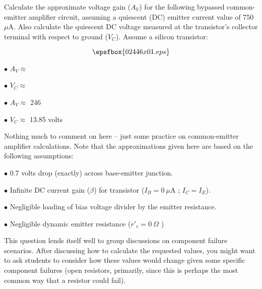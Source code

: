 

Calculate the approximate voltage gain ($A_V$) for the following bypassed common-emitter amplifier circuit, assuming a quiescent (DC) emitter current value of 750 $\mu$A.  Also calculate the quiescent DC voltage measured at the transistor's collector terminal with respect to ground ($V_C$).  Assume a silicon transistor:

$$\epsfbox{02446x01.eps}$$

\medskip
\goodbreak
\item{$\bullet$} $A_V \approx$ 
\item{$\bullet$} $V_C \approx$ 
\medskip







\medskip
\goodbreak
\item{$\bullet$} $A_V \approx$ 246
\item{$\bullet$} $V_C \approx$ 13.85 volts
\medskip







Nothing much to comment on here -- just some practice on common-emitter amplifier calculations.  Note that the approximations given here are based on the following assumptions:

\medskip
\goodbreak
\item{$\bullet$} 0.7 volts drop (exactly) across base-emitter junction.
\item{$\bullet$} Infinite DC current gain ($\beta$) for transistor ($I_B = 0 \> \mu$A ; $I_C = I_E$).
\item{$\bullet$} Negligible loading of bias voltage divider by the emitter resistance.
\item{$\bullet$} Negligible dynamic emitter resistance ($r'_e = 0 \> \Omega$ )
\medskip

This question lends itself well to group discussions on component failure scenarios.  After discussing how to calculate the requested values, you might want to ask students to consider how these values would change given some specific component failures (open resistors, primarily, since this is perhaps the most common way that a resistor could fail).




